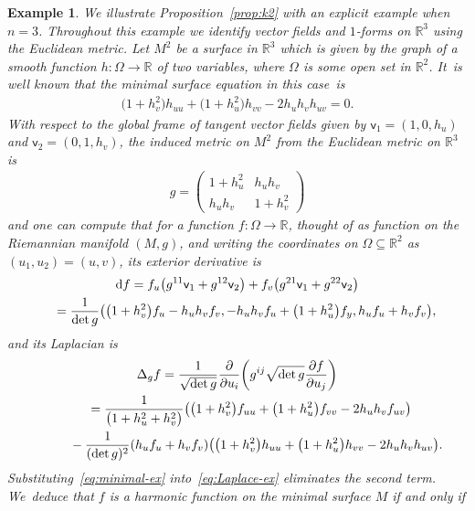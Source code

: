 \documentclass[10pt,a4paper]{amsart}
\def\R{\mathbb{R}}
\def\vv{\mathsf{v}}
\newtheorem{Example}[Theorem]{Example}
\numberwithin{equation}{section}
\begin{document}
\begin{Example} %
We illustrate Proposition~\ref{prop:k2} with an explicit example when $n=3$. Throughout this example we identify vector fields and $1$-forms on $\R^3$ using the Euclidean metric. Let $M^2$ be a surface in $\R^3$ which is given by the graph of a smooth function $h\colon \Omega \to \R$ of two variables, where $\Omega$ is some open set in $\R^2$. It~is well known that the minimal surface equation in this case~is
\begin{gather} \label{eq:minimal-ex}
\big(1 + h_v^2\big) h_{uu} + \big(1 + h_u^2\big) h_{vv} - 2 h_u h_v h_{uv} = 0.
\end{gather}
With respect to the global frame of tangent vector fields given by $\vv_1 = ( 1, 0, h_u)$ and $\vv_2 = (0, 1, h_v)$, the induced metric on $M^2$ from the Euclidean metric on $\R^3$ is
\begin{gather*}
g = \begin{pmatrix} 1 + h_u^2 & h_u h_v \\ h_u h_v & 1 + h_v^2 \end{pmatrix}
\end{gather*}
and one can compute that for a function $f\colon \Omega \to \R$, thought of as function on the Riemannian manifold $(M, g)$, and writing the coordinates on $\Omega \subseteq \R^2$ as $(u_1, u_2) = (u,v)$, its exterior derivative is
\begin{gather}
{\rm d} f = f_u \big(g^{11} \vv_1 + g^{12} \vv_2\big) + f_v \big(g^{21} \vv_1 + g^{22} \vv_2\big) \nonumber
\\ \hphantom{{\rm d} f}
\label{eq:exterior-ex}
 {}= \frac{1}{\det g} \big( \big(1 + h_v^2\big) f_u - h_u h_v f_v, - h_u h_v f_u + \big(1 + h_u^2\big) f_y, h_u f_u + h_v f_v \big),
\end{gather}
and its Laplacian is
\begin{gather}
\nonumber
\Delta_g f = \frac{1}{\sqrt{\det g}} \frac{\partial}{\partial u_i}
\bigg(g^{ij} \sqrt{\det g} \frac{\partial f}{\partial u_j} \bigg)
\\ \hphantom{\Delta_g f}
\nonumber
{}= \frac{1}{\big(1 + h_u^2 + h_v^2\big)} \big( \big(1+ h_v^2\big) f_{uu} + \big(1 + h_u^2\big) f_{vv} - 2 h_u h_v f_{uv} \big)
\\ \hphantom{\Delta_g f=}
\label{eq:Laplace-ex}
{} - \frac{1}{(\det g)^2} (h_u f_u + h_v f_v ) \big( \big(1 + h_v^2\big) h_{uu} + \big(1 + h_u^2\big) h_{vv} - 2 h_u h_v h_{uv} \big).
\end{gather}
Substituting~\eqref{eq:minimal-ex} into~\eqref{eq:Laplace-ex} eliminates the second term. We~deduce that $f$ is a harmonic function on the minimal surface $M$ if and only if

\end{Example}
\end{document}
